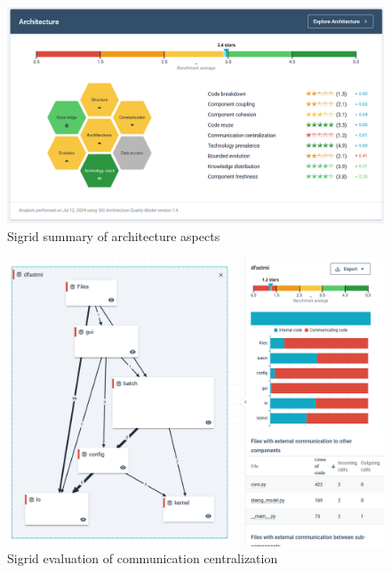 \begin{figure}
\center
\includegraphics[width=\textwidth]{figures/sigrid-architecture.png}
\caption{Sigrid summary of architecture aspects}
\label{fig:sigrid_architecture_overview}
\end{figure}

\begin{figure}
\center
\includegraphics[width=\textwidth]{figures/sigrid-arch-communication.png}
\caption{Sigrid evaluation of communication centralization}
\label{fig:sigrid_architecture_comm}
\end{figure}
